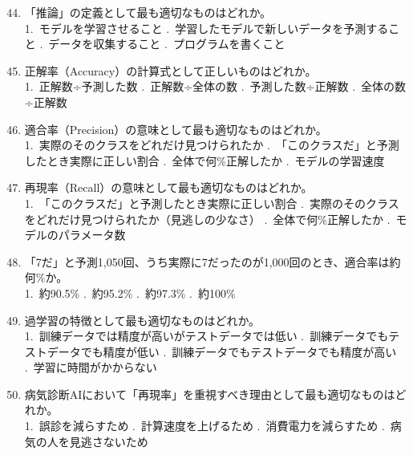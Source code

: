 \documentclass[b4paper,7pt,twocolumn,landscape]{jsarticle}
\begin{document}
\begin{enumerate}
\setcounter{enumi}{43}
\item 「推論」の定義として最も適切なものはどれか。\\
1.~モデルを学習させること .~学習したモデルで新しいデータを予測すること .~データを収集すること .~プログラムを書くこと

\item 正解率（Accuracy）の計算式として正しいものはどれか。\\
1.~正解数÷予測した数 .~正解数÷全体の数 .~予測した数÷正解数 .~全体の数÷正解数

\item 適合率（Precision）の意味として最も適切なものはどれか。\\
1.~実際のそのクラスをどれだけ見つけられたか .~「このクラスだ」と予測したとき実際に正しい割合 .~全体で何\%正解したか .~モデルの学習速度

\item 再現率（Recall）の意味として最も適切なものはどれか。\\
1.~「このクラスだ」と予測したとき実際に正しい割合 .~実際のそのクラスをどれだけ見つけられたか（見逃しの少なさ） .~全体で何\%正解したか .~モデルのパラメータ数

\item 「7だ」と予測1,050回、うち実際に7だったのが1,000回のとき、適合率は約何\%か。\\
1.~約90.5\% .~約95.2\% .~約97.3\% .~約100\%

\item 過学習の特徴として最も適切なものはどれか。\\
1.~訓練データでは精度が高いがテストデータでは低い .~訓練データでもテストデータでも精度が低い .~訓練データでもテストデータでも精度が高い .~学習に時間がかからない

\item 病気診断AIにおいて「再現率」を重視すべき理由として最も適切なものはどれか。\\
1.~誤診を減らすため .~計算速度を上げるため .~消費電力を減らすため .~病気の人を見逃さないため
\end{enumerate}
\end{document}
